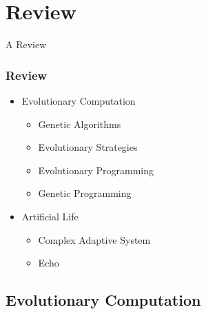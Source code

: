 \section{Review}

\frame
{
	\begin{center}
		\LARGE A Review
	\end{center}
}

\frame
{
	\frametitle{Review}
	
	\begin{itemize}
		\item Evolutionary Computation
			\begin{itemize}
				\item Genetic Algorithms
				\item Evolutionary Strategies
				\item Evolutionary Programming
				\item Genetic Programming
			\end{itemize}
		\item Artificial Life
			\begin{itemize}
				\item Complex Adaptive System
				\item Echo
			\end{itemize}
	\end{itemize}
}

\subsection{Evolutionary Computation}

